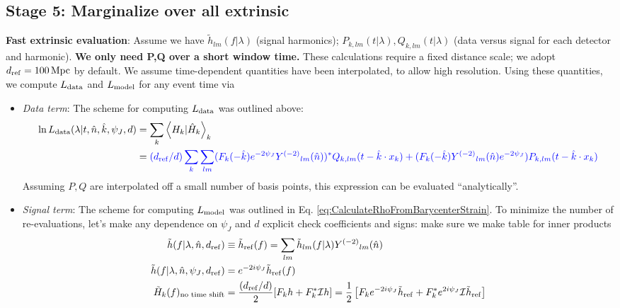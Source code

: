 \documentclass[twocolumn,prd,nofootinbib]{revtex4}
\newcommand\editremark[1]{{\color{red} #1}}
\newcommand\unit[1]{\, {\rm #1}}
\newcommand\Y[1]{Y^{(#1)}{}}
\newcommand\qmstateproduct[2]{\left\langle#1|#2\right\rangle}
\begin{document}
\begin{widetext}
\subsection{Stage 5: Marginalize over all extrinsic }

\noindent \textbf{Fast extrinsic evaluation}: Assume we have $\tilde{h}_{lm}(f|\lambda)$ (signal harmonics);
$P_{k,lm}(t|\lambda),Q_{k,lm}(t|\lambda)$ (data versus signal for each detector and harmonic).  \textbf{We only need P,Q
  over a short window time.}  These calculations
require a fixed distance scale; we adopt $d_{\rm ref}=100\unit{Mpc}$ by default.  We assume time-dependent quantities
have been interpolated, to allow high resolution.  Using these quantities, we compute
$L_{\rm data}$ and $L_{\rm model}$ for any event time via
\begin{itemize}
\item \emph{Data term}:  The scheme for computing $L_{\rm data}$ was outlined above:
\begin{align}
\ln L_{\rm data}(\lambda|t,\hat{n},\hat{k},\psi_J,d) &= \sum_k\qmstateproduct{H_k}{\hat{H}_k}_k \nonumber \\
& =
{\color{blue} (d_{\rm ref}/d) \sum_k \sum_{lm}(F_k(-\hat{k}) e^{-2\psi_J} \Y{-2}_{lm}(\hat{n}))^* Q_{k,lm}(t-\hat{k}\cdot x_k)
   + (F_k(-\hat{k}) \Y{-2}_{lm}(\hat{n}) e^{-2\psi_J}) P_{k,lm}(t-\hat{k}\cdot x_k) 
}
\end{align}
Assuming $P,Q$ are interpolated off a small number of basis points, this expression can be evaluated ``analytically''.
\item \emph{Signal term}:  The scheme for computing $L_{\rm model}$ was outlined in
  Eq. \ref{eq:CalculateRhoFromBarycenterStrain}.     To minimize the number of re-evaluations, let's make any dependence on
  $\psi_J$ and $d$ explicit
\editremark{check coefficients and signs: make sure we make table for inner products}
\begin{align}
\tilde{h}(f|\lambda,\hat{n},d_{\rm ref}) &\equiv \tilde{h}_{\rm ref}(f) = \sum_{lm} \tilde{h}_{lm}(f|\lambda) \Y{-2}_{lm}(\hat{n}) \\
\tilde{h}(f|\lambda,\hat{n},\psi_J,d_{\rm ref})&= e^{-2i\psi_J} \tilde{h}_{\rm ref}(f) \\
\tilde{H}_k(f)_{\text{no time shift}} &= \frac{(d_{\rm ref}/d)}{2}[F_k h + F^*_k {\cal I} h]
   = \frac{1}{2}\left[
   F_k e^{-2i\psi_J} \tilde{h}_{\rm ref} +F_k^* e^{2i\psi_J}{\cal I}\tilde{h}_{\rm ref}
  \right] \\

\end{align}
\end{itemize}
\end{widetext}
\end{document}
